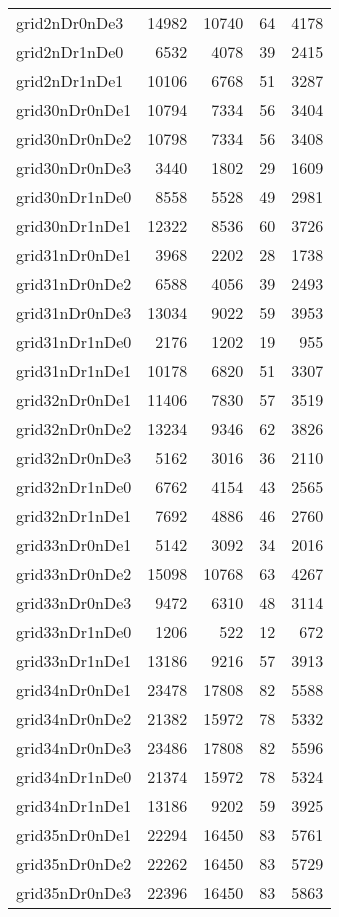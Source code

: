 \begin{tabular}{lrrrr}
grid2nDr0nDe3 & 14982 & 10740 & 64 & 4178 \\
grid2nDr1nDe0 & 6532 & 4078 & 39 & 2415 \\
grid2nDr1nDe1 & 10106 & 6768 & 51 & 3287 \\
grid30nDr0nDe1 & 10794 & 7334 & 56 & 3404 \\
grid30nDr0nDe2 & 10798 & 7334 & 56 & 3408 \\
grid30nDr0nDe3 & 3440 & 1802 & 29 & 1609 \\
grid30nDr1nDe0 & 8558 & 5528 & 49 & 2981 \\
grid30nDr1nDe1 & 12322 & 8536 & 60 & 3726 \\
grid31nDr0nDe1 & 3968 & 2202 & 28 & 1738 \\
grid31nDr0nDe2 & 6588 & 4056 & 39 & 2493 \\
grid31nDr0nDe3 & 13034 & 9022 & 59 & 3953 \\
grid31nDr1nDe0 & 2176 & 1202 & 19 & 955 \\
grid31nDr1nDe1 & 10178 & 6820 & 51 & 3307 \\
grid32nDr0nDe1 & 11406 & 7830 & 57 & 3519 \\
grid32nDr0nDe2 & 13234 & 9346 & 62 & 3826 \\
grid32nDr0nDe3 & 5162 & 3016 & 36 & 2110 \\
grid32nDr1nDe0 & 6762 & 4154 & 43 & 2565 \\
grid32nDr1nDe1 & 7692 & 4886 & 46 & 2760 \\
grid33nDr0nDe1 & 5142 & 3092 & 34 & 2016 \\
grid33nDr0nDe2 & 15098 & 10768 & 63 & 4267 \\
grid33nDr0nDe3 & 9472 & 6310 & 48 & 3114 \\
grid33nDr1nDe0 & 1206 & 522 & 12 & 672 \\
grid33nDr1nDe1 & 13186 & 9216 & 57 & 3913 \\
grid34nDr0nDe1 & 23478 & 17808 & 82 & 5588 \\
grid34nDr0nDe2 & 21382 & 15972 & 78 & 5332 \\
grid34nDr0nDe3 & 23486 & 17808 & 82 & 5596 \\
grid34nDr1nDe0 & 21374 & 15972 & 78 & 5324 \\
grid34nDr1nDe1 & 13186 & 9202 & 59 & 3925 \\
grid35nDr0nDe1 & 22294 & 16450 & 83 & 5761 \\
grid35nDr0nDe2 & 22262 & 16450 & 83 & 5729 \\
grid35nDr0nDe3 & 22396 & 16450 & 83 & 5863 \\

\end{tabular}
